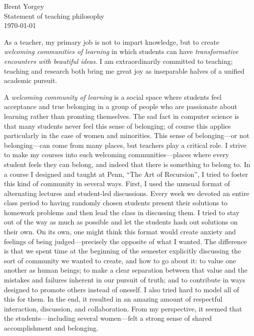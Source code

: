 \documentclass{article}
\begin{document}
\noindent Brent Yorgey \\
Statement of teaching philosophy \\
\today
\bigskip

As a teacher, my primary job is not to impart knowledge, but to create
\emph{welcoming communities of learning} in which students can have
\emph{transformative encounters with beautiful ideas}.  I am
extraordinarily committed to teaching; teaching and research both
bring me great joy as inseparable halves of a unified academic
pursuit.

A \emph{welcoming community of learning} is a social space where
students feel acceptance and true belonging in a group of people who
are passionate about learning rather than promting themselves.  The
sad fact in computer science is that many students never feel this
sense of belonging; of course this applies particularly in the case of
women and minorities. This sense of belonging---or not belonging---can
come from many places, but teachers play a critical role.  I strive to
make my courses into such welcoming communities---places where every
student feels they can belong, and indeed that there is something to
belong to.  In a course I designed and taught at Penn, ``The Art of
Recursion'', I tried to foster this kind of community in several ways.
First, I used the unusual format of alternating lectures and
student-led discussions. Every week we devoted an entire class period
to having randomly chosen students present their solutions to homework
problems and then lead the class in discussing them.  I tried to stay
out of the way as much as possible and let the students hash out
solutions on their own.  On its own, one might think this format would
create anxiety and feelings of being judged---precisely the opposite
of what I wanted.  The difference is that we spent time at the
beginning of the semester explicitly discussing the sort of community
we wanted to create, and how to go about it: to value one another as
human beings; to make a clear separation between that value and the
mistakes and failures inherent in our pursuit of truth; and to
contribute in ways designed to promote others instead of oneself. I
also tried hard to model all of this for them. In the end, it resulted
in an amazing amount of respectful interaction, discussion, and
collaboration. From my perspective, it seemed that the
students---including several women---felt a strong sense of shared
accomplishment and belonging.

\end{document}
